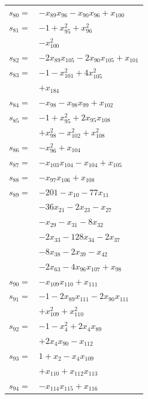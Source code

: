 \begin{longtable}{@{}r@{\;}l@{}}
\(s_{80}=\) & \(\displaystyle -x_{89}x_{96} -x_{90}x_{96} +x_{100}\) \\[3pt]
\(s_{81}=\) & \(\displaystyle -1 +x_{95}^{2} +x_{96}^{2}\) \\
 & \(\displaystyle -x_{100}^{2}\) \\[3pt]
\(s_{82}=\) & \(\displaystyle -2x_{89}x_{105} -2x_{90}x_{105} +x_{101}\) \\[3pt]
\(s_{83}=\) & \(\displaystyle -1 -x_{101}^{2} +4x_{105}^{2}\) \\
 & \(\displaystyle +x_{184}\) \\[3pt]
\(s_{84}=\) & \(\displaystyle -x_{98} -x_{98}x_{99} +x_{102}\) \\[3pt]
\(s_{85}=\) & \(\displaystyle -1 +x_{95}^{2} +2x_{95}x_{108}\) \\
 & \(\displaystyle +x_{98}^{2} -x_{102}^{2} +x_{108}^{2}\) \\[3pt]
\(s_{86}=\) & \(\displaystyle -x_{96}^{2} +x_{104}\) \\[3pt]
\(s_{87}=\) & \(\displaystyle -x_{103}x_{104} -x_{104} +x_{105}\) \\[3pt]
\(s_{88}=\) & \(\displaystyle -x_{97}x_{106} +x_{108}\) \\[3pt]
\(s_{89}=\) & \(\displaystyle -201 -x_{10} -77x_{11}\) \\
 & \(\displaystyle -36x_{21} -2x_{23} -x_{27}\) \\
 & \(\displaystyle -x_{29} -x_{31} -8x_{32}\) \\
 & \(\displaystyle -2x_{33} -128x_{34} -2x_{37}\) \\
 & \(\displaystyle -8x_{38} -2x_{39} -x_{42}\) \\
 & \(\displaystyle -2x_{63} -4x_{96}x_{107} +x_{98}\) \\[3pt]
\(s_{90}=\) & \(\displaystyle -x_{109}x_{110} +x_{111}\) \\[3pt]
\(s_{91}=\) & \(\displaystyle -1 -2x_{89}x_{111} -2x_{90}x_{111}\) \\
 & \(\displaystyle +x_{109}^{2} +x_{110}^{2}\) \\[3pt]
\(s_{92}=\) & \(\displaystyle -1 -x_{4}^{2} +2x_{4}x_{89}\) \\
 & \(\displaystyle +2x_{4}x_{90} -x_{112}\) \\[3pt]
\(s_{93}=\) & \(\displaystyle 1 +x_{2} -x_{4}x_{109}\) \\
 & \(\displaystyle +x_{110} +x_{112}x_{113}\) \\[3pt]
\(s_{94}=\) & \(\displaystyle -x_{114}x_{115} +x_{116}\) \\[3pt]

\end{longtable}
